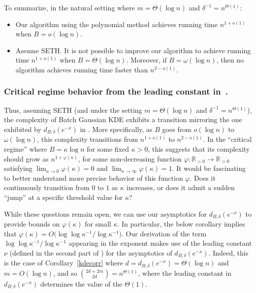 To summarize, in the natural setting where $m = \Theta(\log n)$ and $\delta^{-1} = n^{\Theta(1)}$:
\begin{itemize}
    \item Our algorithm using the polynomial method achieves running time $n^{1+o(1)}$ when $B = o(\log n)$. 
    \item Assume SETH. It is not possible to improve our algorithm to achieve running time $n^{1 + o(1)}$ when $B = \Theta (\log n)$. Moreover, if $B = \omega (\log n)$, then no algorithm achieves running time faster than $n^{2 - o(1)}$.
    
\end{itemize}

 \subsubsection{Critical regime behavior from the leading constant in~.}\label{subsec:3} Thus, assuming SETH (and under the setting $m = \Theta (\log n)$ and $\delta^{-1} = n^{\Theta (1)}$), the complexity of Batch Gaussian KDE exhibits a transition mirroring the one exhibited by $d_{B; \delta} (e^{-x})$ in . More specifically, as $B$ goes from $o (\log n)$ to $\omega (\log n)$, this complexity transitions from $n^{1 + o(1)}$ to $n^{2 - o(1)}$. In the ``critical regime'' where $B = \kappa \log n$ for some fixed $\kappa > 0$, this suggests that its complexity should grow as $n^{1 + \varphi (\kappa)}$, for some non-decreasing function $\varphi: \mathbb{R}_{> 0} \rightarrow \mathbb{R}_{> 0}$ satisfying $\lim_{\kappa \rightarrow 0} \varphi (\kappa) = 0$ and $\lim_{\kappa \rightarrow \infty} \varphi(\kappa) = 1$. It would be fascinating to better understand more precise behavior of this function $\varphi$. Does it continuously transition from $0$ to $1$ as $\kappa$ increases, or does it admit a sudden ``jump'' at a specific threshold value for $\kappa$?

While these questions remain open, we can use our asymptotics for $d_{B; \delta} (e^{-x})$ to provide bounds on $\varphi (\kappa)$ for small $\kappa$. In particular, the below corollary implies that $\varphi (\kappa) = O  \big( \log \log \kappa^{-1} / \log \kappa^{-1} \big)$. Our derivation of the term $\log \log \kappa^{-1} / \log \kappa^{-1}$ appearing in the exponent makes use of the leading constant $\nu$ (defined in the second part of ) for the asymptotics of $d_{B; \delta} (e^{-x})$. Indeed, this is the case of Corollary~\ref{kdecorr} where $d = d_{B; \delta} (e^{-x}) = \Theta(\log n)$ and $m = O(\log n)$, and so $\binom{2d+2m}{2d} = n^{\Theta(1)}$, where the leading constant in $d_{B; \delta} (e^{-x})$ determines the value of the $\Theta(1)$. 

